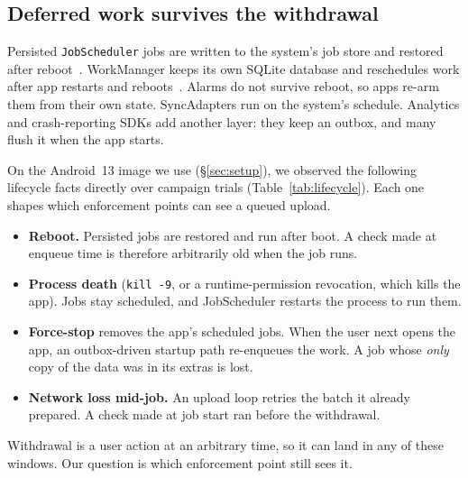 \subsection{Deferred work survives the withdrawal}
\label{sec:deferred}

Persisted \texttt{JobScheduler} jobs are written to
the system's job store and restored after reboot~\cite{android_jobscheduler}. WorkManager keeps its own SQLite database and reschedules work
after app restarts and reboots~\cite{android_workmanager}. Alarms do not survive reboot, so apps re-arm them from their own state. SyncAdapters
run on the system's schedule. Analytics and crash-reporting SDKs add another layer: they keep an outbox, and many flush it when the app
starts.

On the Android~13 image we use (\S\ref{sec:setup}), we observed the following lifecycle facts directly over \lcTrials{} campaign trials
(Table~\ref{tab:lifecycle}). Each one shapes which enforcement points can see a queued upload.

\begin{itemize}[leftmargin=*,nosep]
\item \textbf{Reboot.} Persisted jobs are restored and run after boot. A check made at enqueue time is therefore arbitrarily old when the job runs.
\item \textbf{Process death} (\texttt{kill -9}, or a runtime-permission revocation, which kills the app). Jobs stay scheduled, and JobScheduler restarts the process to run them.
\item \textbf{Force-stop} removes the app's scheduled jobs. When the user next opens the app, an outbox-driven startup path re-enqueues the work. A job whose \emph{only} copy of the data was in its extras is lost.
\item \textbf{Network loss mid-job.} An upload loop retries the batch it already prepared. A check made at job start ran before the withdrawal.
\end{itemize}
Withdrawal is a user action at an arbitrary time, so it can land in any of these windows. Our question is which enforcement point
still sees it.
